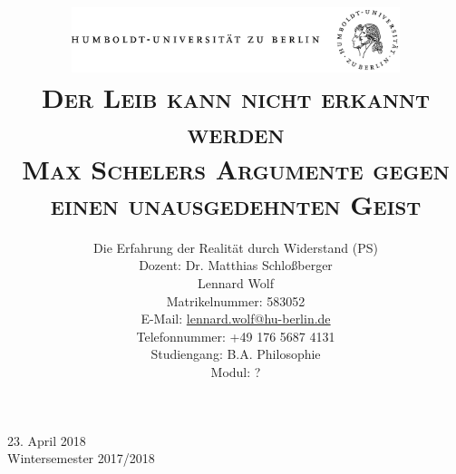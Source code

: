 \documentclass[a4paper, 12pt]{article}
\date{\vspace{-3ex}}
\begin{document}
\title{\vspace{5ex}
	\includegraphics*[bb=0 0 720 200, width=0.72\textwidth]{ErstesSem/images/hu_logo.png}\\
	\vspace{30pt}
	\scshape\LARGE{Der Leib kann nicht erkannt werden
}\\\vspace{5pt}\Large{Max Schelers Argumente gegen einen unausgedehnten Geist}\\\vspace{20pt}}
	


\author{Die Erfahrung der Realität durch Widerstand (PS)\\
	\vspace{7pt}
          Dozent: Dr. Matthias Schloßberger\\\vspace{4pt}Lennard Wolf\\
        \small{Matrikelnummer: 583052}\\
        \small{E-Mail: \href{mailto:lennard.wolf@hu-berlin.de}{lennard.wolf@hu-berlin.de}}\\
        \small{Telefonnummer: +49 176 5687 4131}\\
        \small{Studiengang: B.A. Philosophie}\\
        \small{Modul: ?}}

\maketitle

\vspace{\fill}

\begin{minipage}[]{0.92\textwidth}
    \centering
    \onehalfspacing
    \large   
    23. April 2018\\
    Wintersemester 2017/2018

    \vspace{-20mm} 
\end{minipage}%
\thispagestyle{empty}
\newpage
\setcounter{page}{1}
\end{document}
